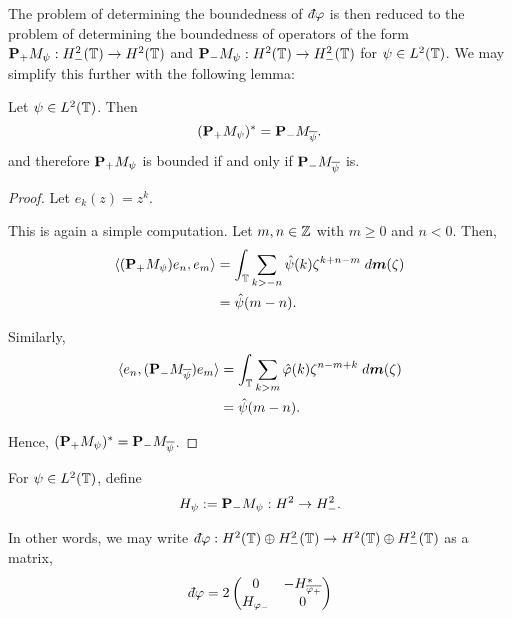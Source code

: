 The problem of determining the boundedness of $\qd\varphi$ is then reduced to the problem of determining
the boundedness of operators of the form $\mathbf{P}_+M_\psi:H^2_-(\mathbb{T})\rightarrow H^2(\mathbb{T})$ and $\mathbf{P}_-M_\psi:H^2(\mathbb{T})\rightarrow H^2_-(\mathbb{T})$ for $\psi \in L^2(\mathbb{T})$. We may simplify
this further with the following lemma:
\begin{lemma}
    Let $\psi \in L^2(\mathbb{T})$. Then
    \begin{equation}
        (\mathbf{P}_+M_\psi)^* = \mathbf{P}_-M_{\overline{\psi}}.
    \end{equation}
    and therefore $\mathbf{P}_+M_\psi$ is bounded if and only if $\mathbf{P}_-M_{\overline{\psi}}$ is.
\end{lemma}
\begin{proof}
    Let $e_k(z) = z^k$. 

    This is again a simple computation. Let $m,n\in \mathbb{Z}$ with $m \geq 0$ and $n < 0$. Then,
    \begin{align*}
        \langle (\mathbf{P}_+M_\psi)e_n,e_m\rangle &= \int_{\mathbb{T}}\sum_{k>-n} \hat{\psi}(k)\zeta^{k+n-m}\;d\boldsymbol{m}(\zeta)\\
        &= \hat{\psi}(m-n).
    \end{align*}
    
    Similarly,
    \begin{align*}
        \langle e_n, (\mathbf{P}_-M_{\overline{\psi}})e_m \rangle &= \int_{\mathbb{T}} \sum_{k > m} \hat{\varphi}(k) \zeta^{n-m+k}\;d\boldsymbol{m}(\zeta)\\
                                                &= \hat{\psi}(m-n).
    \end{align*}
    
    Hence, $(\mathbf{P}_+M_\psi)^* = \mathbf{P}_-M_{\overline{\psi}}$.

\end{proof}

For $\psi \in L^2(\mathbb{T})$, define
\begin{equation}
    H_\psi := \mathbf{P}_-M_\psi:H^2\rightarrow H^2_-.
\end{equation}


In other words, we may write $\qd \varphi:H^2(\Circ)\oplus H^2_-(\Circ)\to H^2(\Circ)\oplus H^2_-(\Circ)$
as a matrix,
\begin{equation}
    \qd \varphi = 2\begin{pmatrix}
        0 & -H_{\overline{\varphi_+}}^*\\
        H_{\varphi_-}  & 0
    \end{pmatrix}
\end{equation}

